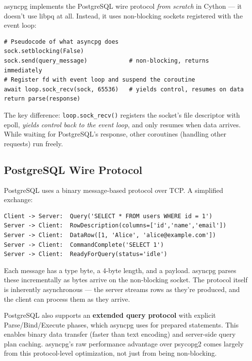 \documentclass[11pt,a4paper,oneside]{book}
\newcommand{\py}[1]{\texttt{\color{pyblue}#1}}
\begin{document}
asyncpg implements the PostgreSQL wire protocol \emph{from scratch} in
Cython --- it doesn't use libpq at all. Instead, it uses non-blocking sockets registered
with the event loop:

\begin{lstlisting}[style=python,numbers=none]
# Pseudocode of what asyncpg does
sock.setblocking(False)
sock.send(query_message)            # non-blocking, returns immediately
# Register fd with event loop and suspend the coroutine
await loop.sock_recv(sock, 65536)   # yields control, resumes on data
return parse(response)
\end{lstlisting}

The key difference: \py{loop.sock\_recv()} registers the socket's file descriptor with epoll,
\emph{yields control back to the event loop}, and only resumes when data arrives. While
waiting for PostgreSQL's response, other coroutines (handling other requests) run freely.

\subsection{PostgreSQL Wire Protocol}

PostgreSQL uses a binary message-based protocol over TCP. A simplified exchange:

\begin{lstlisting}[style=shell,numbers=none]
Client -> Server:  Query('SELECT * FROM users WHERE id = 1')
Server -> Client:  RowDescription(columns=['id','name','email'])
Server -> Client:  DataRow([1, 'Alice', 'alice@example.com'])
Server -> Client:  CommandComplete('SELECT 1')
Server -> Client:  ReadyForQuery(status='idle')
\end{lstlisting}

Each message has a type byte, a 4-byte length, and a payload. asyncpg parses these
incrementally as bytes arrive on the non-blocking socket. The protocol itself is
inherently asynchronous --- the server streams rows as they're produced, and the
client can process them as they arrive.

\begin{infobox}
PostgreSQL also supports an \textbf{extended query protocol} with explicit Parse/Bind/Execute
phases, which asyncpg uses for prepared statements. This enables binary data transfer
(faster than text encoding) and server-side query plan caching. asyncpg's raw performance
advantage over psycopg2 comes largely from this protocol-level optimization, not just from
being non-blocking.
\end{infobox}
\end{document}
